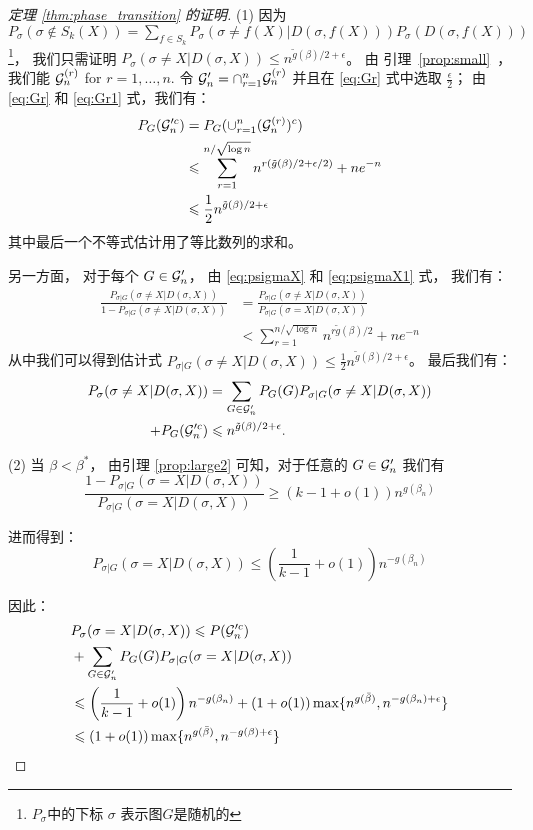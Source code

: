 \begin{proof}[定理 \ref{thm:phase_transition} 的证明]
	(1) 因为 $P_{\sigma}(\sigma \not \in S_k(X)) = \sum_{f\in S_k} P_{\sigma}(\sigma \neq f(X) | D(\sigma, f(X))) P_{\sigma}(D(\sigma, f(X)))$
  \footnote{$P_{\sigma}$中的下标 $\sigma$ 表示图$G$是随机的}，
	我们只需证明 $P_{\sigma}(\sigma \neq X | D(\sigma, X)) \leq  n^{\tilde{g}(\beta)/2 + \epsilon}$。
	由 \mbox{引理 \ref{prop:small} }， 我们能 $\mathcal{G}_n^{(r)}$ for $r=1,\dots, n$.
	令 $\mathcal{G}'_n = \cap_{r=1}^n \mathcal{G}_n^{(r)}$ 
  并且在 \eqref{eq:Gr} 式中选取 $\frac{\epsilon}{2}$；
  由 \eqref{eq:Gr} 和 \eqref{eq:Gr1} 式，我们有：
	\begin{align*}
	P_G(\mathcal{G}'^c_n) &= P_G(\cup_{r=1}^n (\mathcal{G}_n^{(r)})^c) \\
	&\leqslant \sum_{r=1}^{n/\sqrt{\log n } } n^{r(\tilde{g}(\beta)/2 + \epsilon/2)}  + n e^{-n} \\
	& \leqslant \frac{1}{2} n^{\tilde{g}(\beta)/2 + \epsilon}
	\end{align*}
	其中最后一个不等式估计用了等比数列的求和。

	另一方面， 对于每个 $G \in \mathcal{G}'_n$，
  由 \eqref{eq:psigmaX} 和 \eqref{eq:psigmaX1} 式，
	我们有：
	\begin{align*}
	\frac{P_{\sigma | G}(\sigma \neq X | D(\sigma, X))}{1-P_{\sigma | G}(\sigma \neq X | D(\sigma, X))} &= \frac{P_{\sigma | G}(\sigma \neq X | D(\sigma, X))}{P_{\sigma|G}(\sigma=X | D(\sigma, X))} \\
	&< \sum_{r=1}^{n/\sqrt{\log n }}  n^{r\tilde{g}(\beta)/2} + n e^{-n}
	\end{align*}
	从中我们可以得到估计式 $P_{\sigma | G}(\sigma \neq X | D(\sigma, X))\leq \frac{1}{2}n^{\tilde{g}(\beta)/2 + \epsilon}$。
	最后我们有： 
	\begin{align*}
	P_{\sigma}(\sigma \neq X|D(\sigma, X)) &= \sum_{G\in \mathcal{G}'_n} P_G(G)P_{\sigma |G}(\sigma \neq X | D(\sigma, X)) \\
	+ P_G(\mathcal{G}'^c_n)
	& \leqslant n^{\tilde{g}(\beta)/2 + \epsilon}.
	\end{align*}
	
	(2) 当 $\beta < \beta^*$，
  由引理 \ref{prop:large2} 可知，对于任意的 $G \in \mathcal{G}'_n$
	我们有
	$$
	\frac{1-P_{\sigma | G}(\sigma=X | D(\sigma, X))}{P_{\sigma | G}(\sigma=X | D(\sigma, X))}\geq (k-1+o(1))n^{g(\beta_n)}
	$$
	
	进而得到：
	$$
	P_{\sigma | G}(\sigma=X| D(\sigma, X)) \leq \left(\frac{1}{k-1}+o(1) \right) n^{-g(\beta_n)}
	$$
	
	因此：
	\begin{align*}
	&P_{\sigma}(\sigma=X| D(\sigma, X))  \leqslant  P(\mathcal{G}'^c_n) \\
	&+ \sum_{G\in \mathcal{G}'_n}P_G(G) P_{\sigma|G}(\sigma=X| D(\sigma, X)) \\
	& \leqslant \left(
    \frac{1}{k-1}+o(1) \right)
    n^{-g(\beta_n)} + (1+o(1)) \max\{n^{g(\bar{\beta})}, n^{- g(\beta_n) + \epsilon} \}\\
	& \leqslant (1+o(1)) \max\{n^{g(\bar{\beta})}, n^{-g(\beta) + \epsilon}  \}
	\end{align*}
	

\end{proof}
